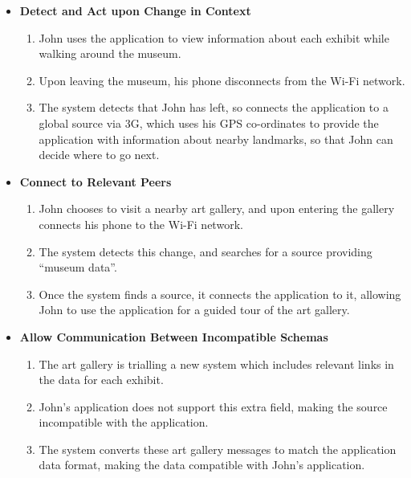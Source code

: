 \documentclass[12pt,twoside,notitlepage]{report}
\begin{document}
\begin{itemize}

\item {\bf Detect and Act upon Change in Context}

\begin{enumerate}

\item John uses the application to view information about each exhibit while walking around the museum.

\item Upon leaving the museum, his phone disconnects from the Wi-Fi network.

\item The system detects that John has left, so connects the application to a global source via 3G, which uses his GPS co-ordinates to provide the application with information about nearby landmarks, so that John can decide where to go next. 

\end{enumerate}

\item {\bf Connect to Relevant Peers}

\begin{enumerate}

\item John chooses to visit a nearby art gallery, and upon entering the gallery connects his phone to the Wi-Fi network.

\item The system detects this change, and searches for a source providing ``museum data''.

\item Once the system finds a source, it connects the application to it, allowing John to use the application for a guided tour of the art gallery. 

\end{enumerate}

\item {\bf Allow Communication Between Incompatible Schemas}

\begin{enumerate}

\item The art gallery is trialling a new system which includes relevant links in the data for each exhibit.  

\item John's application does not support this extra field, making the source incompatible with the application.

\item The system converts these art gallery messages to match the application data format, making the data compatible with John's application. 

\end{enumerate}

\end{itemize}
\end{document}
